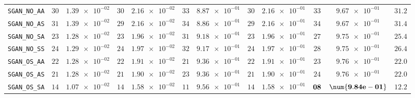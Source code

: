 \begin{xltabular}{\textwidth}{l||cC|cC|cC|cC|cC||c}
	\texttt{SGAN\_NO\_AA} & $ 30$ & $ \num{1.39e-02}$ & $ 30$ & $ \num{2.16e-02}$ & $ 33$ & $ \num{8.87e-01}$ & $ 30$ & $ \num{2.16e-01}$ & $ 33$ & $ \num{9.67e-01}$ & $ 31.2$  \\
	\texttt{SGAN\_NO\_AS} & $ 31$ & $ \num{1.39e-02}$ & $ 29$ & $ \num{2.16e-02}$ & $ 34$ & $ \num{8.86e-01}$ & $ 29$ & $ \num{2.16e-01}$ & $ 34$ & $ \num{9.67e-01}$ & $ 31.4$  \\
	\texttt{SGAN\_NO\_SA} & $ 23$ & $ \num{1.28e-02}$ & $ 23$ & $ \num{1.96e-02}$ & $ 31$ & $ \num{9.18e-01}$ & $ 23$ & $ \num{1.96e-01}$ & $ 27$ & $ \num{9.75e-01}$ & $ 25.4$  \\
	\texttt{SGAN\_NO\_SS} & $ 24$ & $ \num{1.29e-02}$ & $ 24$ & $ \num{1.97e-02}$ & $ 32$ & $ \num{9.17e-01}$ & $ 24$ & $ \num{1.97e-01}$ & $ 28$ & $ \num{9.75e-01}$ & $ 26.4$  \\
	\texttt{SGAN\_OS\_AA} & $ 22$ & $ \num{1.28e-02}$ & $ 22$ & $ \num{1.91e-02}$ & $ 21$ & $ \num{9.36e-01}$ & $ 22$ & $ \num{1.91e-01}$ & $ 23$ & $ \num{9.76e-01}$ & $ 22.0$  \\
	\texttt{SGAN\_OS\_AS} & $ 21$ & $ \num{1.28e-02}$ & $ 21$ & $ \num{1.90e-02}$ & $ 23$ & $ \num{9.36e-01}$ & $ 21$ & $ \num{1.90e-01}$ & $ 24$ & $ \num{9.76e-01}$ & $ 22.0$  \\
	\texttt{SGAN\_OS\_SA} & $ 14$ & $ \num{1.07e-02}$ & $ 14$ & $ \num{1.58e-02}$ & $ 11$ & $ \num{9.56e-01}$ & $ 14$ & $ \num{1.58e-01}$ & $\bf 08$ & $\bf \num{9.84e-01}$ & $ 12.2$  \\

\end{xltabular}
